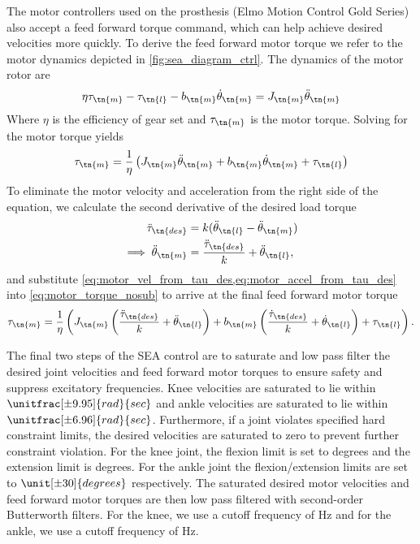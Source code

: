 The motor controllers used on the prosthesis (Elmo Motion Control Gold Series)
also accept a feed forward torque command, which can help achieve desired
velocities more quickly. To derive the feed forward motor torque we refer to the
motor dynamics depicted in \cref{fig:sea_diagram_ctrl}. The dynamics of the
motor rotor are
\begin{align}
    \eta \tau_\tn{m} - \tau_\tn{l} - b_\tn{m} \dot \theta_\tn{m} 
        = J_\tn{m} \ddot \theta_\tn{m}
\end{align}
Where $\eta$ is the efficiency of gear set and $\tau_\tn{m}$ is the motor
torque. Solving for the motor torque yields
\begin{align}
    \tau_\tn{m} = \frac{1}{\eta} \left( J_\tn{m} \ddot \theta_\tn{m} 
        + b_\tn{m} \dot \theta_\tn{m} + \tau_\tn{l} \right)
    \label{eq:motor_torque_nosub}
\end{align}
To eliminate the motor velocity and acceleration from the right side of the
equation, we calculate the second derivative of the desired load torque
\begin{align}
    \ddot \tau_\tn{des} &= k (\ddot \theta_\tn{l} - \ddot \theta_\tn{m}) \\
    \implies \ddot \theta_\tn{m} &= \frac{\ddot \tau_\tn{des}}{k} 
        + \ddot \theta_\tn{l},\label{eq:motor_accel_from_tau_des}
\end{align}
and substitute \cref{eq:motor_vel_from_tau_des,eq:motor_accel_from_tau_des} into
\cref{eq:motor_torque_nosub} to arrive at the final feed forward motor torque
\begin{align}
    \tau_\tn{m} = \frac{1}{\eta} \left( J_\tn{m} 
        \left( \frac{\ddot \tau_\tn{des}}{k} + \ddot \theta_\tn{l} \right)
        + b_\tn{m} \left(\frac{\dot \tau_\tn{des}}{k} + \dot \theta_\tn{l}\right)
        + \tau_\tn{l} \right).
\end{align}

The final two steps of the SEA control are to saturate and low pass filter the
desired joint velocities and feed forward motor torques to ensure safety and
suppress excitatory frequencies. Knee velocities are saturated to lie within
$\unitfrac[\pm 9.95]{rad}{sec}$ and ankle velocities are saturated to lie within
$\unitfrac[\pm 6.96]{rad}{sec}$. Furthermore, if a joint violates specified hard
constraint limits, the desired velocities are saturated to zero to prevent
further constraint violation. For the knee joint, the flexion limit is set to
\unit[90]{degrees} and the extension limit is \unit[-2]{degrees}. For the ankle
joint the flexion/extension limits are set to $\unit[\pm 30]{degrees}$
respectively. The saturated desired motor velocities and feed forward motor
torques are then low pass filtered with second-order Butterworth filters. For
the knee, we use a cutoff frequency of \unit[100]{Hz} and for the ankle, we use
a cutoff frequency of \unit[50]{Hz}.
